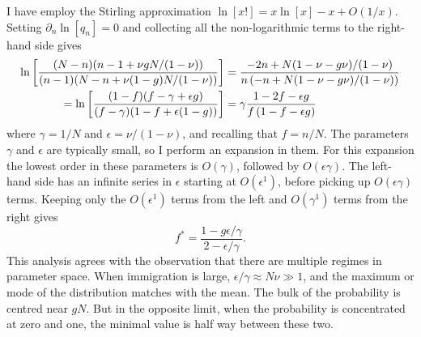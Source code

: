 I have employ the Stirling approximation $\ln[x!] = x\ln[x] - x + O(1/x)$. 
Setting $\partial_n \ln[q_n]=0$ and collecting all the non-logarithmic terms to the right-hand side gives
\begin{align}
 \ln\left[ \frac{(N-n)(n-1+\nu g N/(1-\nu))}{(n-1)(N-n+\nu(1-g)N/(1-\nu))}\right]  &= \frac{-2n+N(1-\nu-g\nu)/(1-\nu)}{n\left(-n+N(1-\nu-g\nu)/(1-\nu)\right)} \notag \\
=\ln\left[ \frac{(1-f)(f-\gamma+\epsilon g)}{(f-\gamma)(1-f+\epsilon(1-g))}\right] &= \gamma\frac{1-2f-\epsilon g}{f\left(1-f-\epsilon g\right)}
\end{align}
where $\gamma = 1/N$ and $\epsilon = \nu/(1-\nu)$, and recalling that $f=n/N$. 
The parameters $\gamma$ and $\epsilon$ are typically small, so I perform an expansion in them. 
For this expansion the lowest order in these parameters is $O(\gamma)$, followed by $O(\epsilon\gamma)$. 
The left-hand side has an infinite series in $\epsilon$ starting at $O(\epsilon^1)$, before picking up $O(\epsilon\gamma)$ terms. 
Keeping only the $O(\epsilon^1)$ terms from the left and $O(\gamma^1)$ terms from the right gives
\begin{equation}
	f^* = \frac{1-g\epsilon/\gamma}{2-\epsilon/\gamma}. %
\end{equation}
This analysis agrees with the observation that there are multiple regimes in parameter space. 
When immigration is large, $\epsilon/\gamma \approx N\nu \gg 1$, and the maximum or mode of the distribution matches with the mean. 
The bulk of the probability is centred near $g N$. 
But in the opposite limit, when the probability is concentrated at zero and one, the minimal value is half way between these two. 

